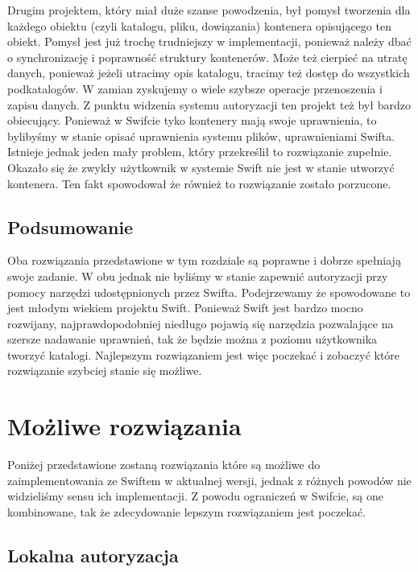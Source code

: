 	Drugim projektem, który miał duże szanse powodzenia, był pomysł tworzenia dla każdego obiektu (czyli katalogu, pliku, dowiązania) kontenera opisującego ten obiekt. Pomysł jest już trochę trudniejszy w implementacji, ponieważ należy dbać o synchronizację i poprawność struktury kontenerów. Może też cierpieć na utratę danych, ponieważ jeżeli utracimy opis katalogu, tracimy też dostęp do wszystkich podkatalogów. W zamian zyskujemy o wiele szybsze operacje przenoszenia i zapisu danych. Z punktu widzenia systemu autoryzacji ten projekt też był bardzo obiecujący. Ponieważ w Swifcie tyko kontenery mają swoje uprawnienia, to bylibyśmy w stanie opisać uprawnienia systemu plików, uprawnieniami Swifta. Istnieje jednak jeden mały problem, który przekreślił to rozwiązanie zupełnie. Okazało się że zwykły użytkownik w systemie Swift nie jest w stanie utworzyć kontenera. Ten fakt spowodował że również to rozwiązanie zostało porzucone.

	\subsection{Podsumowanie}\label{sub:podsumowanie}
	
	Oba rozwiązania przedstawione w tym rozdziale są poprawne i dobrze spełniają swoje zadanie. W obu jednak nie byliśmy w stanie zapewnić autoryzacji przy pomocy narzędzi udostępnionych przez Swifta. Podejrzewamy że spowodowane to jest młodym wiekiem projektu Swift. Ponieważ Swift jest bardzo mocno rozwijany, najprawdopodobniej niedługo pojawią się narzędzia pozwalające na szersze nadawanie uprawnień, tak że będzie można z poziomu użytkownika tworzyć katalogi. Najlepszym rozwiązaniem jest więc poczekać i zobaczyć które rozwiązanie szybciej stanie się możliwe.
	
	\section{Możliwe rozwiązania}\label{sec:mozliwe rozwiazania}

	Poniżej przedstawione zostaną rozwiązania które są możliwe do zaimplementowania ze Swiftem w aktualnej wersji, jednak z różnych powodów nie widzieliśmy sensu ich implementacji. Z powodu ograniczeń w Swifcie, są one kombinowane, tak że zdecydowanie lepszym rozwiązaniem jest poczekać.

	\subsection{Lokalna autoryzacja}\label{sub:lokalna autoryzacja}

